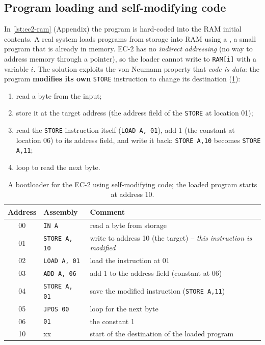 \subsection{Program loading and self-modifying code}
In \cref{lst:ec2-ram} (Appendix) the program is hard-coded into the RAM initial contents. A real system loads programs from storage into RAM using a , a small program that is already in memory. EC-2 has no \emph{indirect addressing} (no way to address memory through a pointer), so the loader cannot write to \texttt{RAM[i]} with a variable $i$. The solution exploits the von Neumann property that \emph{code is data}: the program \textbf{modifies its own} \texttt{STORE} instruction to change its destination (\cref{tab:boot}):
\begin{enumerate}
  \item read a byte from the input;
  \item store it at the target address (the address field of the \texttt{STORE} at location 01);
  \item read the \texttt{STORE} instruction itself (\texttt{LOAD A, 01}), add 1 (the constant at location 06) to its address field, and write it back: \texttt{STORE A,10} becomes \texttt{STORE A,11};
  \item loop to read the next byte.
\end{enumerate}

\begin{table}[htbp]
\centering
\caption{A bootloader for the EC-2 using self-modifying code; the loaded program starts at address 10.}
\label{tab:boot}
\begin{tabular}{cll}
\toprule Address & Assembly & Comment\\ \midrule
00 & \texttt{IN A} & read a byte from storage\\
01 & \texttt{STORE A, 10} & write to address 10 (the target) -- \emph{this instruction is modified}\\
02 & \texttt{LOAD A, 01} & load the instruction at 01\\
03 & \texttt{ADD A, 06} & add 1 to the address field (constant at 06)\\
04 & \texttt{STORE A, 01} & save the modified instruction (\texttt{STORE A,11})\\
05 & \texttt{JPOS 00} & loop for the next byte\\
06 & \texttt{01} & the constant 1\\
10 & xx & start of the destination of the loaded program\\ \bottomrule
\end{tabular}
\end{table}

